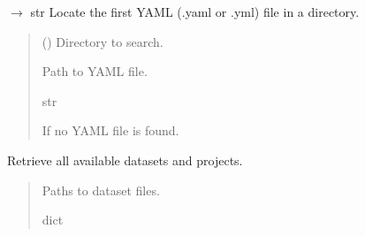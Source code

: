 \documentclass[letterpaper,10pt,english]{sphinxmanual}
\begin{document}
\begin{fulllineitems}
\label{\detokenize{modules/src.model_training.trainer:src.model_training.trainer.find_yaml_file}}
\pysigstartsignatures
\pysiglinewithargsret
{}
{}
{{ $\rightarrow$ str}}
\pysigstopsignatures
\sphinxAtStartPar
Locate the first YAML (.yaml or .yml) file in a directory.
\begin{quote}\begin{description}
\sphinxAtStartPar
{} () \textendash{} Directory to search.

\sphinxAtStartPar
Path to YAML file.

\sphinxAtStartPar
str

\sphinxAtStartPar
{} \textendash{} If no YAML file is found.

\end{description}\end{quote}

\end{fulllineitems}


\begin{fulllineitems}
\label{\detokenize{modules/src.model_training.trainer:src.model_training.trainer.get_data_sets}}
\pysigstartsignatures
\pysiglinewithargsret
{}
{}
{}
\pysigstopsignatures
\sphinxAtStartPar
Retrieve all available datasets and projects.
\begin{quote}\begin{description}
\sphinxAtStartPar
Paths to dataset files.

\sphinxAtStartPar
dict

\end{description}\end{quote}

\end{fulllineitems}
\end{document}
